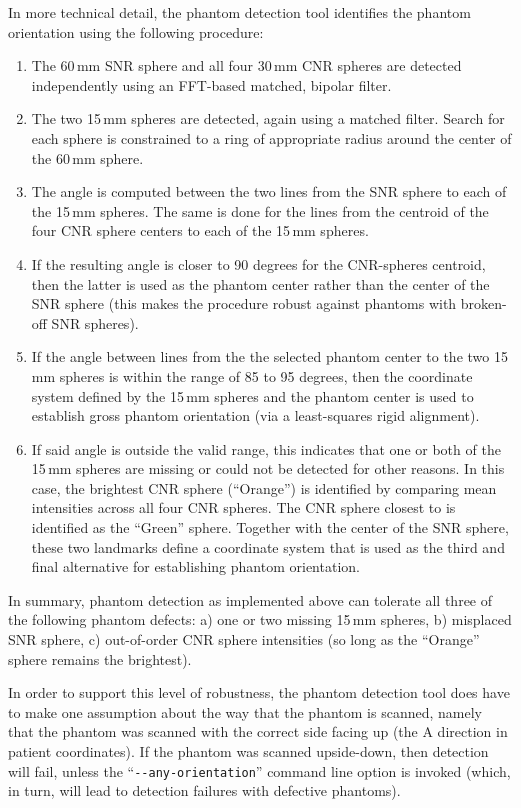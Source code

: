 \documentclass{InsightArticle}
\begin{document}
In more technical detail, the phantom detection tool identifies the phantom
orientation using the following procedure:
\begin{enumerate}
\item The 60\,mm SNR sphere and all four 30\,mm CNR spheres are detected
  independently using an FFT-based matched, bipolar filter. 
\item The two 15\,mm spheres are detected, again using a matched
  filter. Search for each sphere is constrained to a ring of
  appropriate radius around the center of the 60\,mm sphere.
\item The angle is computed between the two lines from the SNR sphere to each
  of the 15\,mm spheres. The same is done for the lines from the centroid 
  of the four CNR sphere centers to each of the 15\,mm spheres.
\item If the resulting angle is closer to 90 degrees for the CNR-spheres
  centroid, then the latter is used as the phantom center rather than the
  center of the SNR sphere (this makes the procedure robust against phantoms
  with broken-off SNR spheres).
\item If the angle between lines from the the selected phantom center to the
  two 15\,mm spheres is within the range of 85 to 95 degrees, then the
  coordinate system defined by the 15\,mm spheres and the phantom center is
  used to establish gross phantom orientation (via a least-squares rigid
  alignment).
\item If said angle is outside the valid range, this indicates that one or
  both of the 15\,mm spheres are missing or could not be detected for other
  reasons. In this case, the brightest CNR sphere (``Orange'') is identified
  by comparing mean intensities across all four CNR spheres. The CNR sphere
  closest to is identified as the ``Green'' sphere. Together with the center
  of the SNR sphere, these two landmarks define a coordinate system that is
  used as the third and final alternative for establishing phantom
  orientation.
\end{enumerate}

In summary, phantom detection as implemented above can tolerate all three of
the following phantom defects: a) one or two missing 15\,mm spheres, b)
misplaced SNR sphere, c) out-of-order CNR sphere intensities (so long as the
``Orange'' sphere remains the brightest).

In order to support this level of robustness, the phantom detection tool does
have to make one assumption about the way that the phantom is scanned, namely
that the phantom was scanned with the correct side facing up (the A direction
in patient coordinates). If the phantom was scanned upside-down, then
detection will fail, unless the ``\verb|--any-orientation|'' command line
option is invoked (which, in turn, will lead to detection failures with
defective phantoms).
\end{document}
